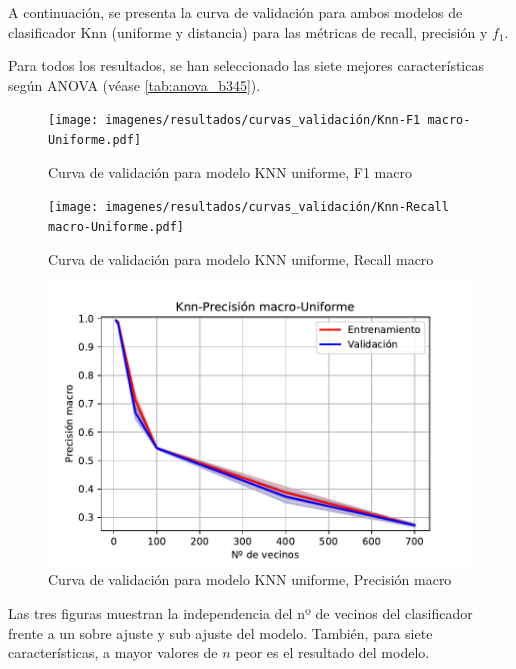 A continuación, se presenta la curva de validación para ambos modelos de clasificador Knn (uniforme y distancia) para las métricas de recall, precisión y $f_{1}$. 

Para todos los resultados, se han seleccionado las siete mejores características según ANOVA (véase \ref{tab:anova_b345}).

\begin{figure}[H]
	\centering
	\captionsetup{justification=centering}
	\texttt{[image: imagenes/resultados/curvas\_validación/Knn-F1 macro-Uniforme.pdf]}
	\caption{Curva de validación para modelo KNN uniforme, F1 macro}
	\label{fig:res_knn_vc_f1}
\end{figure}

\begin{figure}[H]
	\centering
	\captionsetup{justification=centering}
	\texttt{[image: imagenes/resultados/curvas\_validación/Knn-Recall macro-Uniforme.pdf]}
	\caption{Curva de validación para modelo KNN uniforme, Recall macro}
	\label{fig:res_knn_vc_recall}
\end{figure}

\begin{figure}[H]
	\centering
	\captionsetup{justification=centering}
	\includegraphics[width=\textwidth]{imagenes/resultados/curvas_validación/Knn-Precisión macro-Uniforme.pdf}
	\caption{Curva de validación para modelo KNN uniforme, Precisión macro}
	\label{fig:res_knn_vc_precision}
\end{figure}

Las tres figuras muestran la independencia del nº de vecinos del clasificador frente a un sobre ajuste y sub ajuste del modelo. También, para siete características, a mayor valores de $n$ peor es el resultado del modelo. 

